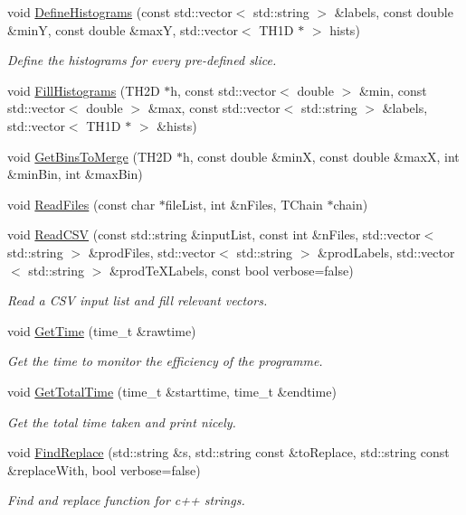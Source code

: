 \begin{DoxyCompactItemize}
void \hyperlink{namespacecalib_a0c91c7c7722a9fb26ab6c875525abb28}{Define\-Histograms} (const std\-::vector$<$ std\-::string $>$ \&labels, const double \&min\-Y, const double \&max\-Y, std\-::vector$<$ T\-H1\-D $\ast$ $>$ hists)
\begin{DoxyCompactList}\small\item\em Define the histograms for every pre-\/defined slice. \end{DoxyCompactList}\item 
void \hyperlink{namespacecalib_aa22908bcf9b16a83f1208d56eeded460}{Fill\-Histograms} (T\-H2\-D $\ast$h, const std\-::vector$<$ double $>$ \&min, const std\-::vector$<$ double $>$ \&max, const std\-::vector$<$ std\-::string $>$ \&labels, std\-::vector$<$ T\-H1\-D $\ast$ $>$ \&hists)
\item 
void \hyperlink{namespacecalib_a32e9a8dfc31d0d22703fda42cf1b2757}{Get\-Bins\-To\-Merge} (T\-H2\-D $\ast$h, const double \&min\-X, const double \&max\-X, int \&min\-Bin, int \&max\-Bin)
\item 
void \hyperlink{namespacecalib_aafd5f5728779f4c79d95f34203b6218f}{Read\-Files} (const char $\ast$file\-List, int \&n\-Files, T\-Chain $\ast$chain)
\item 
void \hyperlink{namespacecalib_a9223ec4660abfa7c4c749e3ef4954e03}{Read\-C\-S\-V} (const std\-::string \&input\-List, const int \&n\-Files, std\-::vector$<$ std\-::string $>$ \&prod\-Files, std\-::vector$<$ std\-::string $>$ \&prod\-Labels, std\-::vector$<$ std\-::string $>$ \&prod\-Te\-X\-Labels, const bool verbose=false)
\begin{DoxyCompactList}\small\item\em Read a C\-S\-V input list and fill relevant vectors. \end{DoxyCompactList}\item 
void \hyperlink{namespacecalib_a561fb5ee74ec984c53d40ad60837c28f}{Get\-Time} (time\-\_\-t \&rawtime)
\begin{DoxyCompactList}\small\item\em Get the time to monitor the efficiency of the programme. \end{DoxyCompactList}\item 
void \hyperlink{namespacecalib_a676d08e0e092c9a8dfdc9cdbd9709fec}{Get\-Total\-Time} (time\-\_\-t \&starttime, time\-\_\-t \&endtime)
\begin{DoxyCompactList}\small\item\em Get the total time taken and print nicely. \end{DoxyCompactList}\item 
void \hyperlink{namespacecalib_acbaccbe06abdfec3dd3f72fee4e5da5c}{Find\-Replace} (std\-::string \&s, std\-::string const \&to\-Replace, std\-::string const \&replace\-With, bool verbose=false)
\begin{DoxyCompactList}\small\item\em Find and replace function for c++ strings. \end{DoxyCompactList}\end{DoxyCompactItemize}
